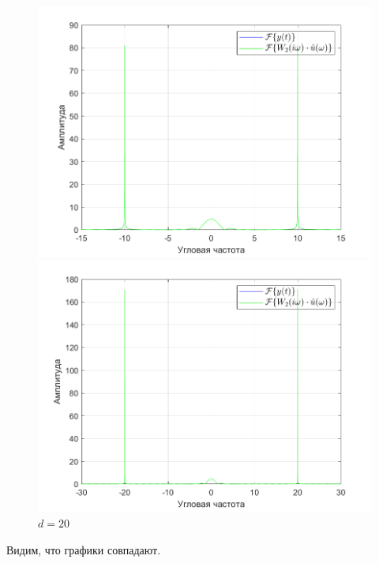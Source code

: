 \documentclass[a4paper]{article}
\begin{document}
\begin{figure}[H]
    \begin{minipage}{0.5\textwidth}
        \centering
        \includegraphics[width=\linewidth]{ex1_2/a1=0_a2=25_b1=10.5_b2=25_d=10/h5.png}
        \caption{$d=10$}
    \end{minipage}
    \begin{minipage}{0.5\textwidth}
        \centering
        \includegraphics[width=\linewidth]{ex1_2/a1=0_a2=25_b1=10.5_b2=25_d=20/h5.png}
        \caption{$d=20$}
    \end{minipage}
\end{figure}

Видим, что графики совпадают.
\end{document}
